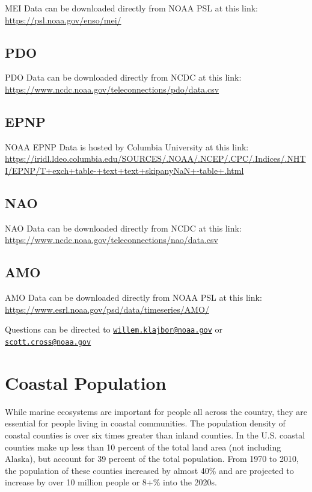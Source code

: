 \documentclass[
]{book}
\begin{document}
MEI Data can be downloaded directly from NOAA PSL at this link: \url{https://psl.noaa.gov/enso/mei/}

\hypertarget{pdo}{%
\section{PDO}\label{pdo}}

PDO Data can be downloaded directly from NCDC at this link: \url{https://www.ncdc.noaa.gov/teleconnections/pdo/data.csv}

\hypertarget{epnp}{%
\section{EPNP}\label{epnp}}

NOAA EPNP Data is hosted by Columbia University at this link: \url{https://iridl.ldeo.columbia.edu/SOURCES/.NOAA/.NCEP/.CPC/.Indices/.NHTI/EPNP/T+exch+table-+text+text+skipanyNaN+-table+.html}

\hypertarget{nao}{%
\section{NAO}\label{nao}}

NAO Data can be downloaded directly from NCDC at this link: \url{https://www.ncdc.noaa.gov/teleconnections/nao/data.csv}

\hypertarget{amo}{%
\section{AMO}\label{amo}}

AMO Data can be downloaded directly from NOAA PSL at this link: \url{https://www.esrl.noaa.gov/psd/data/timeseries/AMO/}

Questions can be directed to \href{mailto:willem.klajbor@noaa.gov}{\nolinkurl{willem.klajbor@noaa.gov}} or \href{mailto:scott.cross@noaa.gov}{\nolinkurl{scott.cross@noaa.gov}}

\hypertarget{coastal-population}{%
\chapter{Coastal Population}\label{coastal-population}}

While marine ecosystems are important for people all across the country, they are essential for people living in coastal communities. The population density of coastal counties is over six times greater than inland counties. In the U.S. coastal counties make up less than 10 percent of the total land area (not including Alaska), but account for 39 percent of the total population. From 1970 to 2010, the population of these counties increased by almost 40\% and are projected to increase by over 10 million people or 8+\% into the 2020s.
\end{document}
